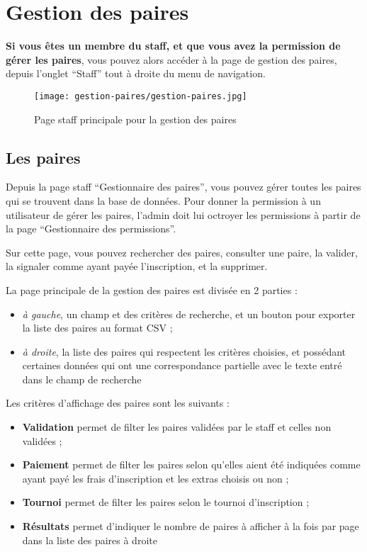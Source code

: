 \section{Gestion des paires}

\textbf{Si vous êtes un membre du staff, et que vous avez la permission de gérer les paires}, vous pouvez alors accéder à la page de gestion des paires, depuis l'onglet \enquote{Staff} tout à droite du menu de navigation.

\begin{figure}[H]
\centering
\texttt{[image: gestion-paires/gestion-paires.jpg]}
\caption{Page staff principale pour la gestion des paires}
\end{figure}

\subsection{Les paires}

Depuis la page staff \enquote{Gestionnaire des paires}, vous pouvez gérer toutes les paires qui se trouvent dans la base de données. Pour donner la permission à un utilisateur de gérer les paires, l'admin doit lui octroyer les permissions à partir de la page \enquote{Gestionnaire des permissions}.

\bigskip

Sur cette page, vous pouvez rechercher des paires, consulter une paire, la valider, la signaler comme ayant payée l'inscription, et la supprimer.\newline

La page principale de la gestion des paires est divisée en 2 parties :

\begin{itemize}
\item \textit{à gauche}, un champ et des critères de recherche, et un bouton pour exporter la liste des paires au format CSV ;
\item \textit{à droite}, la liste des paires qui respectent les critères choisies, et possédant certaines données qui ont une correspondance partielle avec le texte entré dans le champ de recherche
\end{itemize}
\bigskip

Les critères d'affichage des paires sont les suivants :

\begin{itemize}
\item \textbf{Validation} permet de filter les paires validées par le staff et celles non validées ;
\item \textbf{Paiement} permet de filter les paires selon qu'elles aient été indiquées comme ayant payé les frais d'inscription et les extras choisis ou non ;
\item \textbf{Tournoi} permet de filter les paires selon le tournoi d'inscription ;
\item \textbf{Résultats} permet d'indiquer le nombre de paires à afficher à la fois par page dans la liste des paires à droite
\end{itemize}
\bigskip

